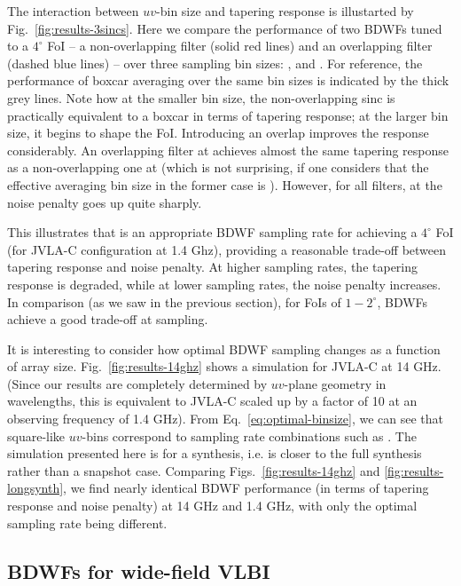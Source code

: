 \documentclass[useAMS,usenatbib]{mn2e}
\begin{document}
The interaction between $uv$-bin size and tapering response is illustarted by Fig.~\ref{fig:results-3sincs}. Here we
compare the performance of two BDWFs tuned to a $4^\circ$ FoI -- a non-overlapping  filter 
(solid red lines) and an overlapping  filter (dashed blue lines) -- over three sampling bin sizes: 
,  and . For reference, the performance of boxcar averaging over the same bin sizes
is indicated by the thick grey lines. Note how at the smaller bin size, the non-overlapping sinc is practically 
equivalent to a boxcar in terms of tapering response; at the larger bin size, it begins to shape the FoI. Introducing an 
overlap improves the response considerably. An overlapping filter at  achieves almost the same tapering
response as a non-overlapping one at  (which is not surprising, if one considers that the effective 
averaging bin size in the former case is ). However, for all filters, at  the noise penalty 
goes up quite sharply. 

This illustrates that  is an appropriate BDWF sampling rate for achieving a $4^\circ$ FoI (for JVLA-C configuration at 
1.4 Ghz), providing a reasonable trade-off between tapering response and noise penalty. At higher sampling rates, 
the tapering response is degraded, while at lower sampling rates, the noise penalty increases. In comparison (as we 
saw in the previous section), for FoIs of $1-2^\circ$, BDWFs achieve a good trade-off at  sampling.

It is interesting to consider how optimal BDWF sampling changes as a function of array size. Fig.~\ref{fig:results-14ghz}
shows a simulation for JVLA-C at 14 GHz. (Since our results are completely determined by $uv$-plane geometry in 
wavelengths, this is equivalent to JVLA-C scaled up by a factor of 10 at an observing frequency of 1.4 GHz). 
From Eq.~\ref{eq:optimal-binsize}, we can see that square-like $uv$-bins correspond to 
sampling rate combinations such as . The simulation presented here is for a  synthesis,
i.e. is closer to the full synthesis rather than a snapshot case. Comparing Figs.~\ref{fig:results-14ghz} and 
\ref{fig:results-longsynth}, we find nearly identical BDWF performance (in terms of tapering response and
noise penalty) at 14 GHz and 1.4 GHz, with only the optimal sampling rate being different. 

\subsection{BDWFs for wide-field VLBI}
\end{document}

